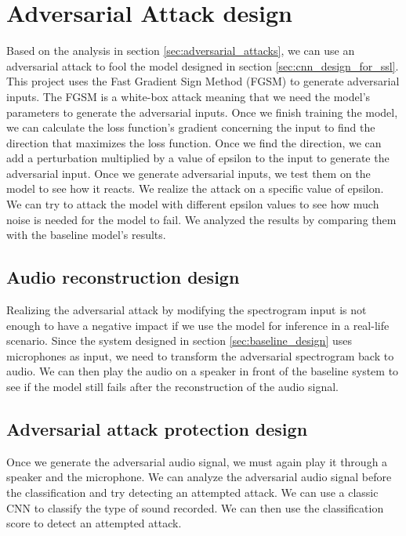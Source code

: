 \section{Adversarial Attack design}

Based on the analysis in section \ref{sec:adversarial_attacks}, we can use an adversarial attack to fool the model designed in section \ref{sec:cnn_design_for_ssl}. This project uses the Fast Gradient Sign Method (FGSM) to generate adversarial inputs. The FGSM is a white-box attack meaning that we need the model's parameters to generate the adversarial inputs. Once we finish training the model, we can calculate the loss function's gradient concerning the input to find the direction that maximizes the loss function. Once we find the direction, we can add a perturbation multiplied by a value of epsilon to the input to generate the adversarial input. 
Once we generate adversarial inputs, we test them on the model to see how it reacts. We realize the attack on a specific value of epsilon. We can try to attack the model with different epsilon values to see how much noise is needed for the model to fail. We analyzed the results by comparing them with the baseline model's results.

\subsection{Audio reconstruction design}

Realizing the adversarial attack by modifying the spectrogram input is not enough to have a negative impact if we use the model for inference in a real-life scenario. Since the system designed in section \ref{sec:baseline_design} uses microphones as input, we need to transform the adversarial spectrogram back to audio. We can then play the audio on a speaker in front of the baseline system to see if the model still fails after the reconstruction of the audio signal.

\subsection{Adversarial attack protection design}

Once we generate the adversarial audio signal, we must again play it through a speaker and the microphone. We can analyze the adversarial audio signal before the classification and try detecting an attempted attack. We can use a classic CNN to classify the type of sound recorded. We can then use the classification score to detect an attempted attack.
